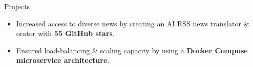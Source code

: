 \documentclass{resume} %
\begin{document}
\begin{workSection}{Projects}
	\customItem[
		title=\href{https://github.com/AshkanArabim/newsbridge}{Newsbridge (news.ashkan.zone) \faExternalLink},
		technologies= | FastAPI{,} React{,} PostgreSQL{,} JavaScript{,} Docker,
		duration=%
	]
	\begin{itemize}
		\vspace{-0.5em}
		\itemsep -6pt {}
		\item Increased access to diverse news by creating an AI RSS news translator \& orator with \textbf{55 GitHub stars}.
		\item Ensured load-balancing \& scaling capacity by using a \textbf{Docker Compose microservice architecture}.
	\end{itemize}
	

\end{workSection}
\end{document}
